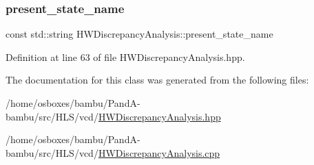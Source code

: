 \subsubsection{\texorpdfstring{present\+\_\+state\+\_\+name}{present\_state\_name}}
{\footnotesize\ttfamily const std\+::string H\+W\+Discrepancy\+Analysis\+::present\+\_\+state\+\_\+name\hspace{0.3cm}{\ttfamily [protected]}}



Definition at line 63 of file H\+W\+Discrepancy\+Analysis.\+hpp.



The documentation for this class was generated from the following files\+:\begin{DoxyCompactItemize}
\item 
/home/osboxes/bambu/\+Pand\+A-\/bambu/src/\+H\+L\+S/vcd/\hyperlink{HWDiscrepancyAnalysis_8hpp}{H\+W\+Discrepancy\+Analysis.\+hpp}\item 
/home/osboxes/bambu/\+Pand\+A-\/bambu/src/\+H\+L\+S/vcd/\hyperlink{HWDiscrepancyAnalysis_8cpp}{H\+W\+Discrepancy\+Analysis.\+cpp}\end{DoxyCompactItemize}
